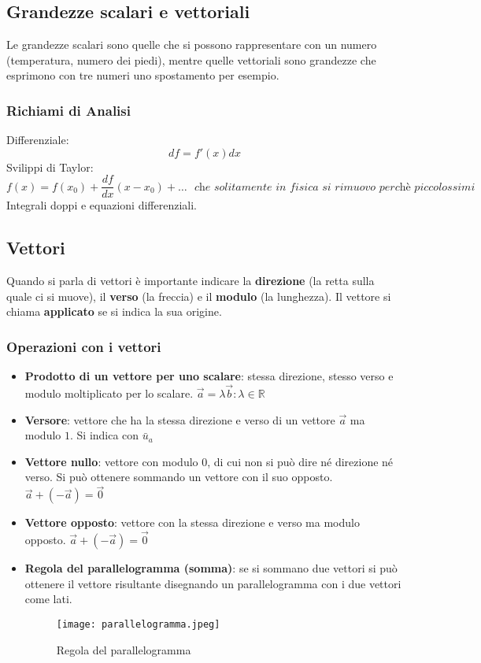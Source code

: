 \documentclass[../../main.tex]{subfiles}
\begin{document}
\subsection{Grandezze scalari e vettoriali}
Le grandezze scalari sono quelle che si possono rappresentare con un numero (temperatura, numero dei piedi), mentre quelle vettoriali sono grandezze che esprimono con tre numeri uno spostamento per esempio.
\subsubsection{Richiami di Analisi}
Differenziale:
\[
    df = f'(x)dx
\]
Svilippi di Taylor:
\[
    f(x) = f(x_0) + \dfrac{df}{dx} (x-x_0) + \ldots \ \ \ \textit{che solitamente in fisica si rimuovo perchè piccolossimi}
\]
Integrali doppi e equazioni differenziali.
\subsection{Vettori}
Quando si parla di vettori è importante indicare la \textbf{direzione} (la retta sulla quale ci si muove), il \textbf{verso} (la freccia) e il \textbf{modulo} (la lunghezza). Il vettore si chiama \textbf{applicato} se si indica la sua origine.
\subsubsection{Operazioni con i vettori}
\begin{itemize}
    \item \textbf{Prodotto di un vettore per uno scalare}: stessa direzione, stesso verso e modulo moltiplicato per lo scalare. $\vec{a} = \lambda \vec{b} : \lambda \in \mathbb{R}$
    \item \textbf{Versore}: vettore che ha la stessa direzione e verso di un vettore $\vec{a}$ ma modulo $1$. Si indica con $\bar{u}_a$
    \item \textbf{Vettore nullo}: vettore con modulo $0$, di cui non si può dire né direzione né verso. Si può ottenere sommando un vettore con il suo opposto. $\vec{a} + (-\vec{a}) = \vec{0}$
    \item \textbf{Vettore opposto}: vettore con la stessa direzione e verso ma modulo opposto. $\vec{a} + (-\vec{a}) = \vec{0}$
    \item \textbf{Regola del parallelogramma (somma)}: se si sommano due vettori si può ottenere il vettore risultante disegnando un parallelogramma con i due vettori come lati.
          \begin{figure}[h!]
              \centering
              \texttt{[image: parallelogramma.jpeg]}
              \caption{Regola del parallelogramma}
          \end{figure}
\end{itemize}
\end{document}

